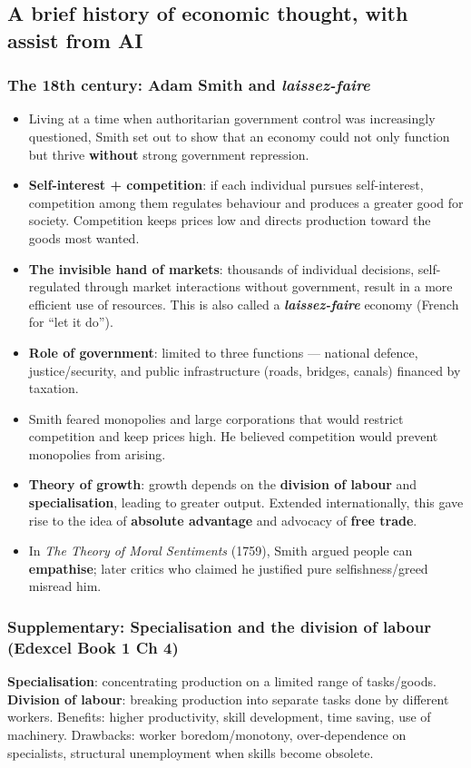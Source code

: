 \documentclass[a4paper,12pt]{article}
\newcommand{\needbold}[1]{\textcolor{red!70!black}{\textbf{#1}}}
\begin{document}
\subsection{A brief history of economic thought, with assist from AI}
\subsubsection*{The 18th century: Adam Smith and \textit{laissez-faire}}
\begin{itemize}
  \item Living at a time when authoritarian government control was increasingly questioned, Smith set out to show that an economy could not only function but thrive \textbf{without} strong government repression.
  \item \textbf{Self-interest + competition}: if each individual pursues self-interest, competition among them regulates behaviour and produces a greater good for society. Competition keeps prices low and directs production toward the goods most wanted.
  \item \textbf{The invisible hand of markets}: thousands of individual decisions, self-regulated through market interactions without government, result in a more efficient use of resources. This is also called a \textbf{\textit{laissez-faire}} economy (French for ``let it do'').
  \item \textbf{Role of government}: limited to three functions --- national defence, justice/security, and public infrastructure (roads, bridges, canals) financed by taxation.
  \item Smith feared monopolies and large corporations that would restrict competition and keep prices high. He believed competition would prevent monopolies from arising.
  \item \textbf{Theory of growth}: growth depends on the \textbf{division of labour} and \textbf{specialisation}, leading to greater output. Extended internationally, this gave rise to the idea of \textbf{absolute advantage} and advocacy of \textbf{free trade}.
  \item In \textit{The Theory of Moral Sentiments} (1759), Smith argued people can \textbf{empathise}; later critics who claimed he justified pure selfishness/greed misread him.
\end{itemize}
\subsubsection*{Supplementary: Specialisation and the division of labour (Edexcel Book 1 Ch 4)}
\needbold{Specialisation}: concentrating production on a limited range of tasks/goods. \needbold{Division of labour}: breaking production into separate tasks done by different workers. Benefits: higher productivity, skill development, time saving, use of machinery. Drawbacks: worker boredom/monotony, over-dependence on specialists, structural unemployment when skills become obsolete.
\end{document}
